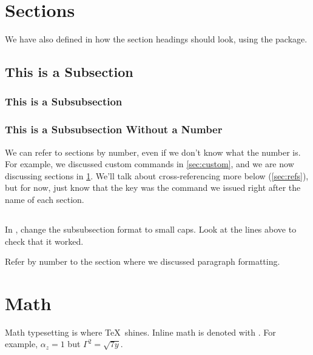 \documentclass{article}
\begin{document}
\section{Sections}
\label{sec:sections}

We have also defined in  how the section headings should look, using the  package.

\subsection{This is a Subsection}

\subsubsection{This is a Subsubsection}

\subsubsection*{This is a Subsubsection Without a Number}

We can refer to sections by number, even if we don't know what the number is.
For example, we discussed custom commands in \cref{sec:custom}, and we are now discussing sections in \cref{sec:sections}.
We'll talk about cross-referencing more below (\cref{sec:refs}), but for now, just know that the key was the \latexcode{\\label} command we issued right after the name of each section.

\subsection{\task}

In , change the subsubsection format to small caps.
Look at the lines above to check that it worked.

Refer by number to the section where we discussed paragraph formatting.

\section{Math}
\label{sec:math}

Math typesetting is where \TeX\ shines.
Inline math is denoted with \latexcode{\$}.
For example, $\alpha_z = 1$ but $\Gamma^2 = \sqrt{7 y}$.
\end{document}

